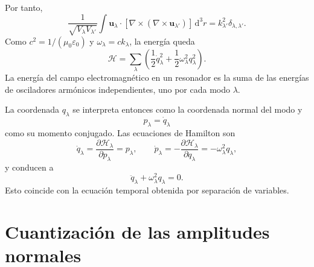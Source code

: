 \documentclass[11pt]{article}
\newcommand{\dd}{\mathrm{d}}
\newcommand{\vb}[1]{\mathbf{#1}}
\begin{document}
Por tanto,
\begin{equation}
  \frac{1}{\sqrt{V_\lambda V_{\lambda'}}}
  \int
  \vb u_\lambda\cdot
  [\nabla\times(\nabla\times\vb u_{\lambda'})]\,\dd^3r
  =
  k_{\lambda'}^2\delta_{\lambda,\lambda'}.
\end{equation}
Como $c^2=1/(\mu_0\varepsilon_0)$ y $\omega_\lambda=ck_\lambda$,
la energ\'ia queda
\begin{equation}
  \boxed{
  \mathcal H
  =
  \sum_\lambda
  \left(
  \frac{1}{2}\dot q_\lambda^2
  +
  \frac{1}{2}\omega_\lambda^2q_\lambda^2
  \right).
  }
\end{equation}
La energ\'ia del campo electromagn\'etico en un resonador es la suma de las
energ\'ias de osciladores arm\'onicos independientes, uno por cada modo
$\lambda$.

La coordenada $q_\lambda$ se interpreta entonces como la coordenada normal del
modo y
\begin{equation}
  p_\lambda=\dot q_\lambda
\end{equation}
como su momento conjugado. Las ecuaciones de Hamilton son
\begin{equation}
  \dot q_\lambda
  =
  \frac{\partial\mathcal H_\lambda}{\partial p_\lambda}
  =
  p_\lambda,
  \qquad
  \dot p_\lambda
  =
  -\frac{\partial\mathcal H_\lambda}{\partial q_\lambda}
  =
  -\omega_\lambda^2q_\lambda,
\end{equation}
y conducen a
\begin{equation}
  \ddot q_\lambda+\omega_\lambda^2q_\lambda=0.
\end{equation}
Esto coincide con la ecuaci\'on temporal obtenida por separaci\'on de
variables.

\section{Cuantizaci\'on de las amplitudes normales}
\end{document}
